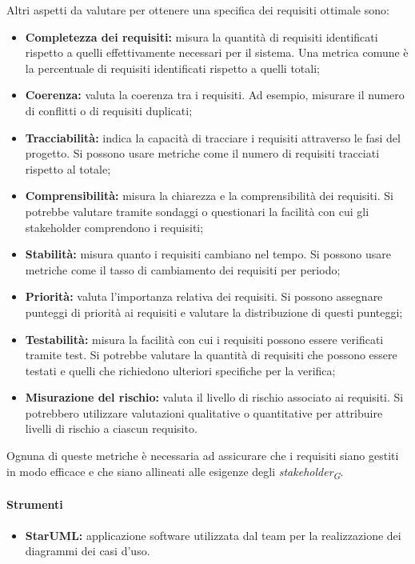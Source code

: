 Altri aspetti da valutare per ottenere una specifica dei requisiti ottimale sono: 
\begin{itemize}
    \item \textbf{Completezza dei requisiti:} misura la quantità di requisiti identificati rispetto a quelli effettivamente necessari per il sistema. Una metrica comune è la percentuale di requisiti identificati rispetto a quelli totali;
    \item \textbf{Coerenza:} valuta la coerenza tra i requisiti. Ad esempio, misurare il numero di conflitti o di requisiti duplicati;
    \item \textbf{Tracciabilità:} indica la capacità di tracciare i requisiti attraverso le fasi del progetto. Si possono usare metriche come il numero di requisiti tracciati rispetto al totale;
    \item \textbf{Comprensibilità:} misura la chiarezza e la comprensibilità dei requisiti. Si potrebbe valutare tramite sondaggi o questionari la facilità con cui gli stakeholder comprendono i requisiti;
    \item \textbf{Stabilità:} misura quanto i requisiti cambiano nel tempo. Si possono usare metriche come il tasso di cambiamento dei requisiti per periodo;
    \item \textbf{Priorità:} valuta l'importanza relativa dei requisiti. Si possono assegnare punteggi di priorità ai requisiti e valutare la distribuzione di questi punteggi;
    \item \textbf{Testabilità:} misura la facilità con cui i requisiti possono essere verificati tramite test. Si potrebbe valutare la quantità di requisiti che possono essere testati e quelli che richiedono ulteriori specifiche per la verifica;
    \item \textbf{Misurazione del rischio:} valuta il livello di rischio associato ai requisiti. Si potrebbero utilizzare valutazioni qualitative o quantitative per attribuire livelli di rischio a ciascun requisito.
\end{itemize}
Ognuna di queste metriche è necessaria ad assicurare che i requisiti siano gestiti in modo efficace e che siano allineati alle esigenze degli \textit{stakeholder}\textsubscript{\textit{G}}.

\paragraph{Strumenti}
\begin{itemize}
    \item \textbf{StarUML:} applicazione software utilizzata dal team per la realizzazione dei diagrammi dei casi d'uso.
\end{itemize}

